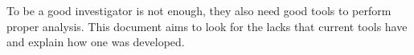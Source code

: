 
To be a good investigator is not enough, they also need good tools to perform
proper analysis. This document aims to look for the lacks that current tools 
have and explain how one was developed.


%
%


